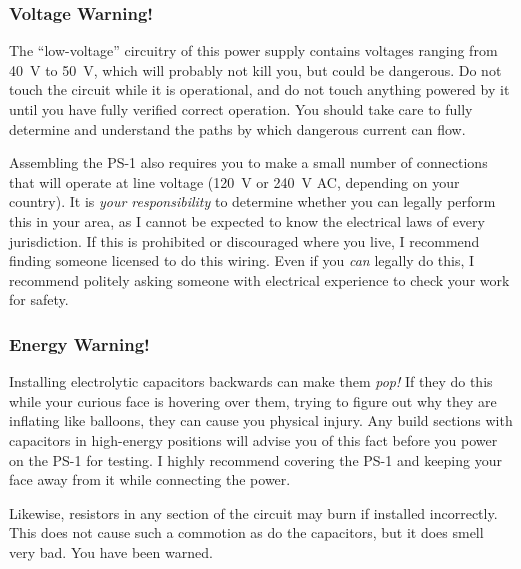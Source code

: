 \subsubsection{Voltage Warning!}
The ``low-voltage'' circuitry of this power supply contains voltages
ranging from 40~V to 50~V, which will probably not kill you, but could be
dangerous.  Do not touch the circuit while it is operational, and do not touch
anything powered by it until you have fully verified correct operation. You
should take care to fully determine and understand the paths by which dangerous
current can flow.

Assembling the PS-1 also requires you to make a small number of connections
that will operate at line voltage (120~V or 240~V AC, depending on your
country). It is \emph{your responsibility} to determine whether you can legally
perform this in your area, as I cannot be expected to know the electrical laws
of every jurisdiction. If this is prohibited or discouraged where you live,
I recommend finding someone licensed to do this wiring. Even if you \emph{can}
legally do this, I recommend politely asking someone with electrical experience
to check your work for safety.

\subsubsection{Energy Warning!}
Installing electrolytic capacitors backwards can make them \emph{pop!} If they
do this while your curious face is hovering over them, trying to figure out why
they are inflating like balloons, they can cause you physical injury. Any build
sections with capacitors in high-energy positions will advise you of this fact
before you power on the PS-1 for testing. I highly recommend covering the PS-1
and keeping your face away from it while connecting the power.

Likewise, resistors in any section of the circuit may burn if installed
incorrectly. This does not cause such a commotion as do the capacitors, but
it does smell very bad. You have been warned.
